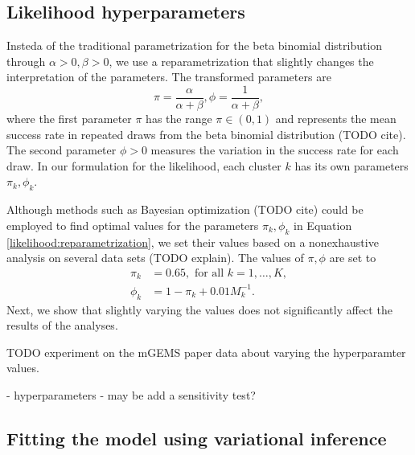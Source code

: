 \documentclass[officiallayout]{tktla}
\begin{document}
\subsection{Likelihood hyperparameters}

Insteda of the traditional parametrization for the beta binomial
distribution through $\alpha >0, \beta > 0$, we use a
reparametrization that slightly changes the interpretation of the
parameters. The transformed parameters are
\begin{equation}
  \label{likelihood:reparametrization}
  \pi = \frac{\alpha}{\alpha + \beta}, \phi = \frac{1}{\alpha + \beta},
\end{equation}
where the first parameter $\pi$ has the range $\pi \in \left(0,
1\right)$ and represents the mean success rate in repeated draws from
the beta binomial distribution (TODO cite). The second parameter $\phi
> 0$ measures the variation in the success rate for each draw. In our
formulation for the likelihood, each cluster $k$ has its own
parameters $\pi_{k}, \phi_{k}$.

Although methods such as Bayesian optimization (TODO cite) could
be employed to find optimal values for the parameters $\pi_{k}, \phi_{k}$ in
Equation \ref{likelihood:reparametrization}, we set their values based
on a nonexhaustive analysis on several data sets (TODO explain). The
values of $\pi, \phi$ are set to
\begin{equation}
  \begin{aligned}
    \pi_k &= 0.65, \text{ for all } k = 1, \dots, K, \\
    \phi_{k} &= 1 - \pi_{k} + 0.01M_{k}^{-1}.
  \end{aligned}
\end{equation}
Next, we show that slightly varying the values does not significantly
affect the results of the analyses.

TODO experiment on the mGEMS paper data about varying the
hyperparamter values.

- hyperparameters - may be add a sensitivity test?

\subsection{Fitting the model using variational inference}
\end{document}
